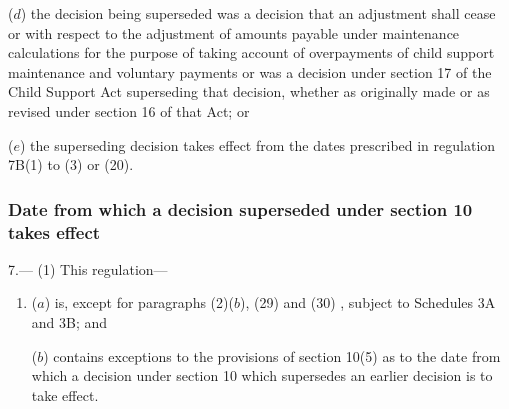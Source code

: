 \documentclass[12pt,a4paper]{article}
\begin{document}
{\begin{enumerate}
($d$) the decision being superseded was a decision that an adjustment shall cease or with respect to the adjustment of amounts payable under maintenance calculations for the purpose of taking account of overpayments of child support maintenance and voluntary payments or was a decision under section 17 of the Child Support Act superseding that decision, whether as originally made or as revised under section 16 of that Act; or

($e$) the superseding decision takes effect from the dates prescribed in regulation 7B(1) to (3)
or (20).
\end{enumerate}

}

\subsubsection[7. Date from which a decision superseded under section 10 takes effect]{Date from which a decision superseded under section 10 takes effect}

7.—%
%
(1) This regulation---
\begin{enumerate}\item[]


($a$) is, except for 
paragraphs (2)($b$), (29) and (30)%
, subject to Schedules 3A and 3B; and

($b$) contains exceptions to the provisions of section 10(5) as to the date from which a decision under section 10 which supersedes an earlier decision is to take effect.
\end{enumerate}
\end{document}
